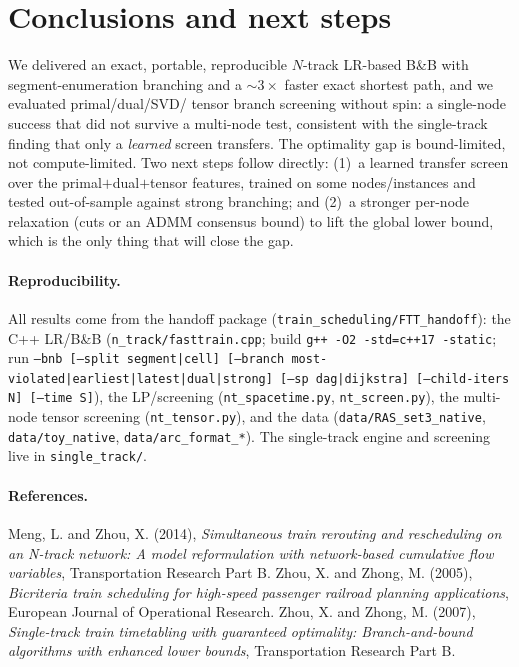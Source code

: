 \documentclass[11pt]{article}
\begin{document}
\section{Conclusions and next steps}
We delivered an exact, portable, reproducible $N$-track LR-based B\&B with segment-enumeration
branching and a $\sim\!3\times$ faster exact shortest path, and we evaluated primal/dual/SVD/
tensor branch screening without spin: a single-node success that did not survive a multi-node
test, consistent with the single-track finding that only a \emph{learned} screen transfers.
The optimality gap is bound-limited, not compute-limited. Two next steps follow directly:
(1)~a learned transfer screen over the primal$+$dual$+$tensor features, trained on some
nodes/instances and tested out-of-sample against strong branching; and (2)~a stronger per-node
relaxation (cuts or an ADMM consensus bound) to lift the global lower bound, which is the only
thing that will close the gap.

\paragraph{Reproducibility.} All results come from the handoff package
(\texttt{train\_scheduling/FTT\_handoff}): the C++ LR/B\&B (\texttt{n\_track/fasttrain.cpp};
build \texttt{g++ -O2 -std=c++17 -static}; run \texttt{--bnb [--split segment|cell]
[--branch most-violated|earliest|latest|dual|strong] [--sp dag|dijkstra] [--child-iters N]
[--time S]}), the LP/screening (\texttt{nt\_spacetime.py}, \texttt{nt\_screen.py}), the
multi-node tensor screening (\texttt{nt\_tensor.py}), and the data
(\texttt{data/RAS\_set3\_native}, \texttt{data/toy\_native}, \texttt{data/arc\_format\_*}).
The single-track engine and screening live in \texttt{single\_track/}.

\paragraph{References.} Meng, L. and Zhou, X. (2014), \emph{Simultaneous train rerouting and
rescheduling on an N-track network: A model reformulation with network-based cumulative flow
variables}, Transportation Research Part B. \quad Zhou, X. and Zhong, M. (2005),
\emph{Bicriteria train scheduling for high-speed passenger railroad planning applications},
European Journal of Operational Research. \quad Zhou, X. and Zhong, M. (2007),
\emph{Single-track train timetabling with guaranteed optimality: Branch-and-bound algorithms
with enhanced lower bounds}, Transportation Research Part B.
\end{document}

